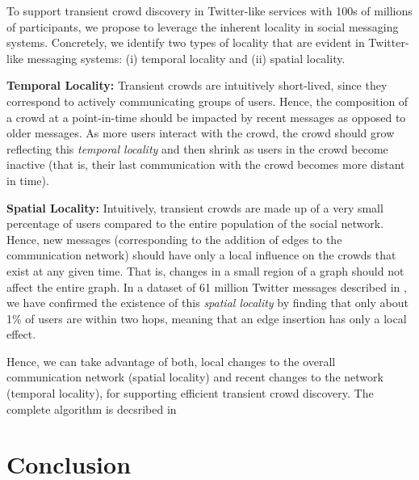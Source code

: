 \documentclass{sig-alternate}
\begin{document}
To support transient crowd discovery in Twitter-like services with 100s of
millions of participants, we propose to leverage the inherent locality in social
messaging systems. Concretely, we identify two types of locality that are
evident in Twitter-like messaging systems: (i) temporal locality and (ii) spatial
locality.

\medskip \noindent\textbf{Temporal Locality:} Transient crowds are
intuitively short-lived, since they correspond to actively communicating groups
of users. Hence, the composition of a crowd at a point-in-time should be impacted
by recent messages as opposed to older messages. As more users interact with the
crowd, the crowd should grow reflecting this \textit{temporal locality} and then
shrink as users in the crowd become inactive (that is, their last communication
with the crowd becomes more distant in time).

\medskip \noindent \textbf{Spatial Locality:} Intuitively, transient crowds are
made up of a very small percentage of users compared to the entire population of
the social network. Hence, new messages (corresponding to the addition of edges
to the communication network) should have only a local influence on the crowds
that exist at any given time. That is, changes in a small region of a graph
should not affect the entire graph. In a dataset of 61 million Twitter messages
described in \cite{Kamath:2011:TCD}, we have confirmed the existence of
this \textit{spatial locality} by finding that only about 1\% of users are within
two hops, meaning that an edge insertion has only a local effect.

\medskip Hence, we can take advantage of both, local changes to the overall
communication network (spatial locality) and recent changes to the network
(temporal locality), for supporting efficient transient crowd discovery. The complete algorithm is decsribed in \cite{Kamath:2011:TCD}

\section{Conclusion}
\label{sec:conclusion}

{\scriptsize
 
 
}
\balancecolumns %
\end{document}
